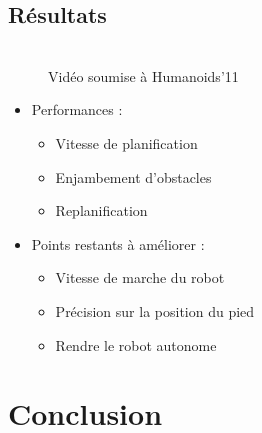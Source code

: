 \documentclass{beamer}
\begin{document}
\subsection{Résultats}
\begin{frame}
  \begin{figure}
    \\
    Vidéo soumise à Humanoids'11
   \end{figure}
 \end{frame}

\begin{frame}
  \begin{itemize}
  \item  Performances :
    \begin{itemize}
    \item Vitesse de planification
    \item Enjambement d'obstacles
    \item Replanification
    \end{itemize}
    \vspace{3mm}
  \item Points restants à améliorer :
    \begin{itemize}
    \item Vitesse de marche du robot
    \item Précision sur la position du pied
    \item Rendre le robot autonome
    \end{itemize}
  \end{itemize}
\end{frame}


\section{Conclusion}
\end{document}
